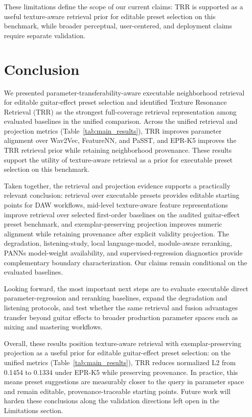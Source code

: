 These limitations define the scope of our current claims: TRR is supported as a useful texture-aware retrieval prior for editable preset selection on this benchmark, while broader perceptual, user-centered, and deployment claims require separate validation.

\section{Conclusion}
\label{sec:conclusion}

We presented parameter-transferability-aware executable neighborhood retrieval for editable guitar-effect preset selection and identified Texture Resonance Retrieval (TRR) as the strongest full-coverage retrieval representation among evaluated baselines in the unified comparison. Across the unified retrieval and projection metrics (Table~\ref{tab:main_results}), TRR improves parameter alignment over Wav2Vec, FeatureNN, and PaSST, and EPR-K5 improves the TRR retrieval prior while retaining neighborhood provenance. These results support the utility of texture-aware retrieval as a prior for executable preset selection on this benchmark.

Taken together, the retrieval and projection evidence supports a practically relevant conclusion: retrieval over executable presets provides editable starting points for DAW workflows, mid-level texture-aware feature representations improve retrieval over selected first-order baselines on the audited guitar-effect preset benchmark, and exemplar-preserving projection improves numeric alignment while retaining provenance after explicit validity projection. The degradation, listening-study, local language-model, module-aware reranking, PANNs model-weight availability, and supervised-regression diagnostics provide complementary boundary characterization. Our claims remain conditional on the evaluated baselines.

Looking forward, the most important next steps are to evaluate executable direct parameter-regression and reranking baselines, expand the degradation and listening protocols, and test whether the same retrieval and fusion advantages transfer beyond guitar effects to broader production parameter spaces such as mixing and mastering workflows.

Overall, these results position texture-aware retrieval with exemplar-preserving projection as a useful prior for editable guitar-effect preset selection: on the unified metrics (Table~\ref{tab:main_results}), TRR reduces normalized L2 from 0.1454 to 0.1334 under EPR-K5 while preserving provenance. In practice, this means preset suggestions are measurably closer to the query in parameter space and remain editable, provenance-traceable starting points. Future work will harden these conclusions along the validation directions left open in the Limitations section.


\begingroup
\sloppy
\raggedright
{}

\endgroup
